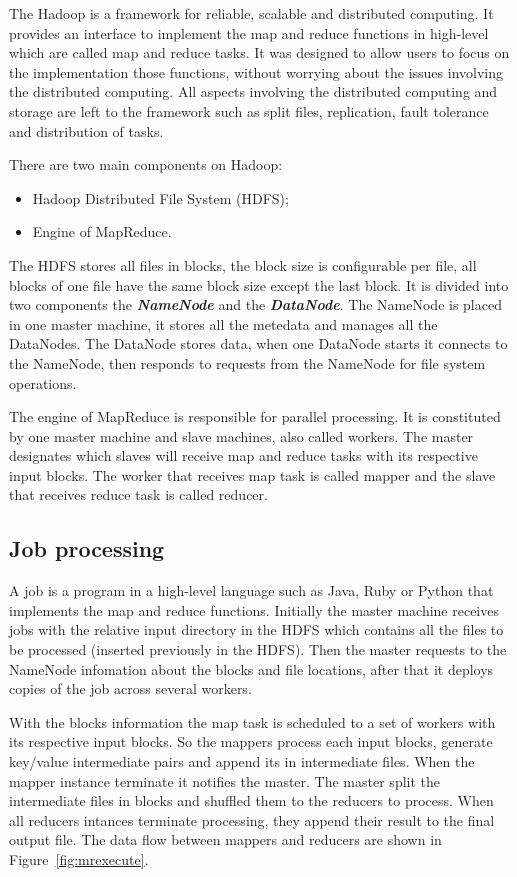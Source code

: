 The Hadoop is a framework for reliable, scalable and distributed computing. It provides
an interface to implement the map and reduce functions in high-level which are
called map and reduce tasks. It was designed to allow users to focus on the implementation
those functions, without worrying about the issues involving the distributed computing.
All aspects involving the distributed computing and storage are left to the framework
such as split files, replication, fault tolerance and distribution of tasks.

There are two main components on Hadoop:
\begin{itemize}
	\item Hadoop Distributed File System (HDFS);
	\item Engine of MapReduce.
\end{itemize}

The HDFS stores all files in blocks, the block size is configurable per file, all
blocks of one file have the same block size except the last block. It is divided
into two components the \textbf{\emph{NameNode}} and the \textbf{\emph{DataNode}}. The NameNode is placed
in one master machine, it stores all the metedata and manages all the DataNodes.
The DataNode stores data, when one DataNode starts it connects to the NameNode,
then responds to requests from the NameNode for file system operations.

The engine of MapReduce is responsible for parallel processing. It is constituted
by one master machine and slave machines, also called workers. The master
designates which slaves will receive map and reduce tasks with its respective input
blocks. The worker that receives map task is called mapper and the slave that receives
reduce task is called reducer.

\subsection{Job processing}

A job is a program in a high-level language such as Java, Ruby or Python that implements
the map and reduce functions. Initially the master machine receives jobs with
the relative input directory in the HDFS which contains all the files to be processed
(inserted previously in the HDFS). Then the master requests to the NameNode infomation
about the blocks and file locations, after that it deploys copies of the job across
several workers.

With the blocks information the map task is scheduled to a set of workers
with its respective input blocks. So the mappers process each input blocks, 
generate key/value intermediate pairs and append its in intermediate files. When
the mapper instance terminate it notifies the master. The master split the intermediate
files in blocks and shuffled them to the reducers to process. When all reducers
intances terminate processing, they append their result to the final output file.
The data flow between mappers and reducers are shown in Figure~\ref{fig:mrexecute}.

